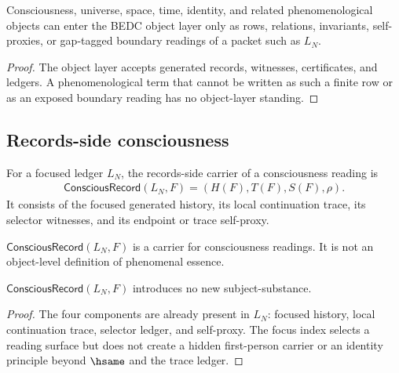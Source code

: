\begin{corollary}
\label{cor:philosophy-phenomenological-objects-records-side}
Consciousness, universe, space, time, identity, and related
phenomenological objects can enter the BEDC object layer only as rows,
relations, invariants, self-proxies, or gap-tagged boundary readings of
a packet such as \(L_N\).
\end{corollary}
\begin{proof}
The object layer accepts generated records, witnesses, certificates,
and ledgers. A phenomenological term that cannot be written as such a
finite row or as an exposed boundary reading has no object-layer
standing.
\end{proof}

\subsection{Records-side consciousness}
\label{subsec:philosophy-records-side-consciousness}

\begin{definition}
\label{def:philosophy-conscious-record}
For a focused ledger \(L_N\), the records-side carrier of a
consciousness reading is
$$
\begin{gathered}
\mathsf{ConsciousRecord}(L_N,F)=(H(F),T(F),S(F),\rho).
\end{gathered}
$$
It consists of the focused generated history, its local continuation
trace, its selector witnesses, and its endpoint or trace self-proxy.
\end{definition}

\begin{definition}
\label{def:philosophy-consciousness-reading}
\(\mathsf{ConsciousRecord}(L_N,F)\) is a carrier for consciousness
readings. It is not an object-level definition of phenomenal essence.
\end{definition}

\begin{theorem}
\label{thm:philosophy-consciousness-carrier-adds-no-subject}
\(\mathsf{ConsciousRecord}(L_N,F)\) introduces no new
subject-substance.
\end{theorem}
\begin{proof}
The four components are already present in \(L_N\): focused history,
local continuation trace, selector ledger, and self-proxy. The focus
index selects a reading surface but does not create a hidden
first-person carrier or an identity principle beyond \(\hsame\) and the
trace ledger.
\end{proof}

